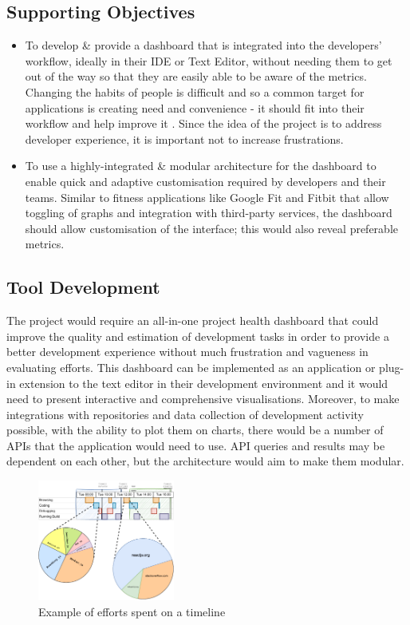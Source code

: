 \documentclass{prrcs}
\begin{document}
\subsection*{Supporting Objectives}

\begin{itemize}
    \item To develop \& provide a dashboard that is integrated into the developers' workflow, ideally in their IDE or Text Editor, without needing them to get out of the way so that they are easily able to be aware of the metrics. Changing the habits of people is difficult and so a common target for applications is creating need and convenience - it should fit into their workflow and help improve it \cite{experienceMemoryRecognitionRecall}. Since the idea of the project is to address developer experience, it is important not to increase frustrations.
    \item To use a highly-integrated \& modular architecture for the dashboard to enable quick and adaptive customisation required by developers and their teams. Similar to fitness applications like Google Fit and Fitbit that allow toggling of graphs and integration with third-party services, the dashboard should allow customisation of the interface; this would also reveal preferable metrics.
\end{itemize}

\subsection*{Tool Development}

The project would require an all-in-one project health dashboard that could improve the quality and estimation of development tasks in order to provide a better development experience without much frustration and vagueness in evaluating efforts. This dashboard can be implemented as an application or plug-in extension to the text editor in their development environment and it would need to present interactive and comprehensive visualisations. Moreover, to make integrations with repositories and data collection of development activity possible, with the ability to plot them on charts, there would be a number of APIs that the application would need to use. API queries and results may be dependent on each other, but the architecture would aim to make them modular.

\begin{figure}[h]
    \centering
    \includegraphics[width=0.4\textwidth]{sampleviz.pdf}
    \caption{Example of efforts spent on a timeline}
\end{figure}
\end{document}
